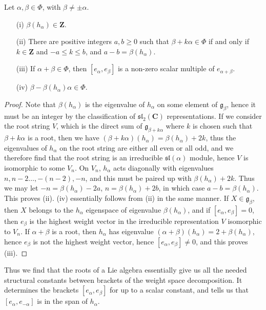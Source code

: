 \begin{theorem}
    Let $\alpha, \beta \in \Phi$, with $\beta \neq \pm \alpha$.
    \begin{enumerate}
        \item[(i)] $\beta(h_\alpha) \in \mathbf{Z}$.
        \item[(ii)] There are positive integers $a,b \geq 0$ such that $\beta + k\alpha \in \Phi$ if and only if $k \in \mathbf{Z}$ and $-a \leq k \leq b$, and $a - b = \beta(h_\alpha)$.
        \item[(iii)] If $\alpha + \beta \in \Phi$, then $[e_\alpha, e_\beta]$ is a non-zero scalar multiple of $e_{\alpha + \beta}$.
        \item[(iv)] $\beta - \beta(h_\alpha)\alpha \in \Phi$.
    \end{enumerate}
\end{theorem}
\begin{proof}
    Note that $\beta(h_\alpha)$ is the eigenvalue of $h_\alpha$ on some element of $\mathfrak{g}_\beta$, hence it must be an integer by the classification of $\mathfrak{sl}_2(\mathbf{C})$ representations. If we consider the root string $V$, which is the direct sum of $\mathfrak{g}_{\beta + k \alpha}$ where $k$ is chosen such that $\beta + k \alpha$ is a root, then we have $(\beta + k \alpha)(h_\alpha) = \beta(h_\alpha) + 2k$, thus the eigenvalues of $h_\alpha$ on the root string are either all even or all odd, and we therefore find that the root string is an irreducible $\mathfrak{sl}(\alpha)$ module, hence $V$ is isomorphic to some $V_n$. On $V_n$, $h_\alpha$ acts diagonally with eigenvalues $n,n-2\dots,-(n-2),-n$, and this must be paired up with $\beta(h_\alpha) + 2k$. Thus we may let $-n = \beta(h_\alpha) - 2a$, $n = \beta(h_\alpha) + 2b$, in which case $a - b = \beta(h_\alpha)$. This proves (ii). (iv) essentially follows from (ii) in the same manner. If $X \in \mathfrak{g}_\beta$, then $X$ belongs to the $h_\alpha$ eigenspace of eigenvalue $\beta(h_\alpha)$, and if $[e_\alpha, e_\beta] = 0$, then $e_\beta$ is the highest weight vector in the irreducible representation $V$ isomorphic to $V_n$. If $\alpha + \beta$ is a root, then $h_\alpha$ has eigenvalue $(\alpha + \beta)(h_\alpha) = 2 + \beta(h_\alpha)$, hence $e_\beta$ is not the highest weight vector, hence $[e_\alpha, e_\beta] \neq 0$, and this proves (iii).
\end{proof}

Thus we find that the roots of a Lie algebra essentially give us all the needed structural constants between brackets of the weight space decomposition. It determines the brackets $[e_\alpha, e_\beta]$ for up to a scalar constant, and tells us that $[e_\alpha, e_{-\alpha}]$ is in the span of $h_\alpha$.




